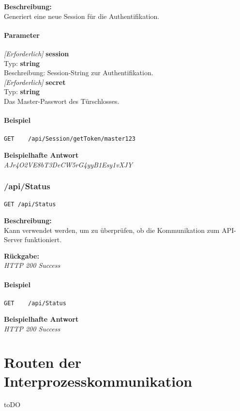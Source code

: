 \textbf{Beschreibung:} \\
Generiert eine neue Session für die Authentifikation.

\subsubsection{Parameter}
\textit{[Erforderlich]} \textbf{session} \\
Typ: \textbf{string} \\
Beschreibung: Session-String zur Authentifikation.\\

\textit{[Erforderlich]} \textbf{secret} \\
Typ: \textbf{string} \\
Das Master-Passwort des Türschlosses.

\subsubsection{Beispiel}
\begin{lstlisting}
GET    /api/Session/getToken/master123
\end{lstlisting}

\textbf{Beispielhafte Antwort} \\
\textit{AJr4O2VE8bT3DeCW5rG4yyB1Esy1vXJY}





\subsection{/api/Status}
\begin{lstlisting}
GET /api/Status
\end{lstlisting}

\textbf{Beschreibung:} \\
Kann verwendet werden, um zu überprüfen, ob die Kommunikation zum API-Server funktioniert.

\textbf{Rückgabe:} \\
\textit{HTTP 200 Success}

\subsubsection{Beispiel}
\begin{lstlisting}
GET    /api/Status
\end{lstlisting}

\textbf{Beispielhafte Antwort} \\
\textit{HTTP 200 Success}


\chapter{Routen der Interprozesskommunikation}
toDO